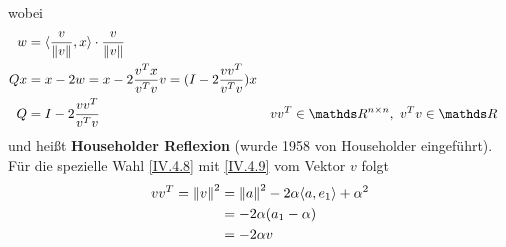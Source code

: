 wobei
\begin{align}
  \nonumber
  w &= \scp{\frac{v}{\nn{v}}}{x} \cdot \frac{v}{\nn{v}} \\ %
  Qx &= x-2w = x-2\frac{v^Tx}{v^Tv}v 
       = (I-2\frac{vv^T}{v^Tv})x 
       \label{IV.4.10}\\
  Q  &= I-2\frac{vv^T}{v^Tv}&& vv^T \in \Renn,\,\, v^Tv\in\R
                               \label{IV.4.11}
\end{align}
und heißt \textbf{Householder Reflexion} 
(wurde  1958 von Householder eingeführt).  \\
Für die spezielle Wahl \eqref{IV.4.8} mit \eqref{IV.4.9} vom Vektor $v$ folgt
\begin{align}\nonumber
  vv^T = \left\| v \right\|^2 &= \left\| a \right\|^2 - 2\alpha\langle a, e_1 \rangle + \alpha^2 \\ \nonumber
                  &= -2\alpha(a_1-\alpha) \\
                  & = -2\alpha v
                    \label{IV.4.12}
\end{align}


